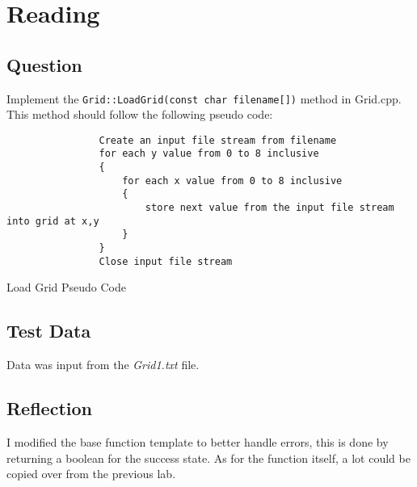 \section{Reading}
    \subsection*{Question}
        Implement the \texttt{Grid::LoadGrid(const char filename[])} method in Grid.cpp.
        This method should follow the following pseudo code:
        \begin{listing}[H]
            \begin{verbatim}
                Create an input file stream from filename
                for each y value from 0 to 8 inclusive
                {
                    for each x value from 0 to 8 inclusive
                    {
                        store next value from the input file stream into grid at x,y
                    }
                }
                Close input file stream
            \end{verbatim}
            \caption{Load Grid Pseudo Code}
        \end{listing}

    \subsection*{Test Data}
        Data was input from the \textit{Grid1.txt} file.

    \subsection*{Reflection}
        I modified the base function template to better handle errors,
        this is done by returning a boolean for the success state.
        As for the function itself, a lot could be copied over from the previous
        lab.
            
